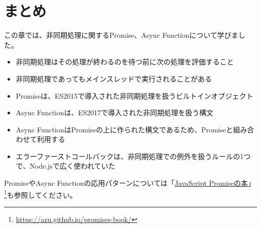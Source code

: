 \hypertarget{conclusion}{%
\section{まとめ}\label{conclusion}}

この章では、非同期処理に関するPromise、Async Functionについて学びました。

\begin{itemize}
\item
  非同期処理はその処理が終わるのを待つ前に次の処理を評価すること
\item
  非同期処理であってもメインスレッドで実行されることがある
\item
  Promiseは、ES2015で導入された非同期処理を扱うビルトインオブジェクト
\item
  Async Functionは、ES2017で導入された非同期処理を扱う構文
\item
  Async
  FunctionはPromiseの上に作られた構文であるため、Promiseと組み合わせて利用する
\item
  エラーファーストコールバックは、非同期処理での例外を扱うルールの1つで、Node.jsで広く使われていた
\end{itemize}

PromiseやAsync
Functionの応用パターンについては「\href{https://azu.github.io/promises-book/}{JavaScript
Promiseの本}」\footnote{\url{https://azu.github.io/promises-book/}}も参照してください。
